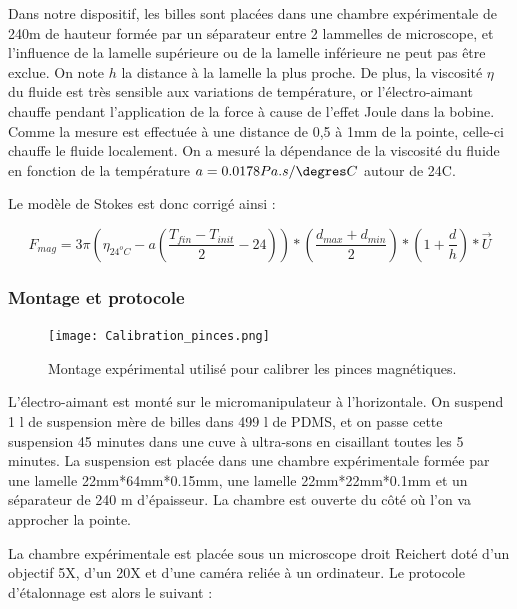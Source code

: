  Dans notre dispositif, les billes sont placées dans une chambre expérimentale de 240\micro m de hauteur formée par un séparateur entre 2 lammelles de microscope, et l'influence de la lamelle supérieure ou de la lamelle inférieure ne peut pas être exclue. On note $h$ la distance à la lamelle la plus proche. 
 De plus, la viscosité $\eta$ du fluide est très sensible aux variations de température, or l'électro-aimant chauffe pendant l'application de la force à cause de l'effet Joule dans la bobine. 
 Comme la mesure est effectuée à une distance de 0,5 à 1mm de la pointe, celle-ci chauffe le fluide localement. 
 On a mesuré la dépendance de la viscosité du fluide en fonction de la température $a=0.0178 Pa.s/\degres C$ autour de 24\degres C. 
 
 Le modèle de Stokes est donc corrigé ainsi : 
 
 \begin{equation}
 {F}_{mag}= 3 \pi \left(\eta_{24^{o}C}-a\left(\frac{T_{fin}-T_{init}}{2} - 24\right) \right) *\left( \frac{d_{max}+d_{min}}{2} \right) * \left( 1+\frac{d}{h} \right)*\vec{U}
 \label{Stokes_corr}
 \end{equation}
 
 \subsubsection{Montage et protocole}
 
 \begin{figure}
 \texttt{[image: Calibration\_pinces.png]}
 \caption{Montage expérimental utilisé pour calibrer les pinces magnétiques.}
 \label{calibration_pinces}
 \end{figure}
 

 
 L'électro-aimant est monté sur le micromanipulateur à l'horizontale.  
 On suspend 1 \micro l de suspension mère de billes dans 499 \micro l de PDMS, et on passe cette suspension 45 minutes dans une cuve à ultra-sons en cisaillant toutes les 5 minutes.
 La suspension est placée dans une chambre expérimentale formée par une lamelle 22mm*64mm*0.15mm, une lamelle 22mm*22mm*0.1mm et un séparateur de 240 \micro m d'épaisseur. La chambre est ouverte du côté où l'on va approcher la pointe. 
 
 La chambre expérimentale est placée sous un microscope droit Reichert doté d'un objectif 5X, d'un 20X et d'une caméra reliée à un ordinateur. Le protocole d'étalonnage est alors le suivant : 
 
